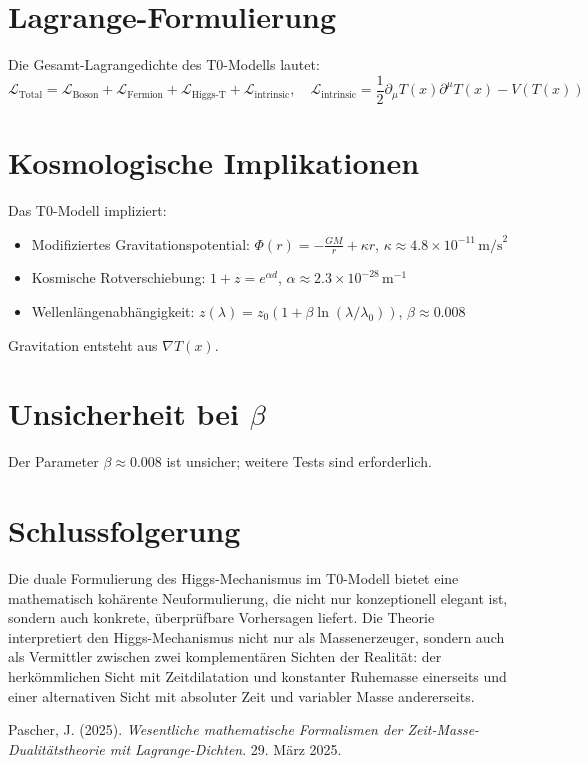 \documentclass[a4paper,12pt]{article}
\newcommand{\Tfield}{T(x)}
\begin{document}
	\section{Lagrange-Formulierung}
	Die Gesamt-Lagrangedichte des T0-Modells lautet:
	\begin{equation}
		\mathcal{L}_{\text{Total}} = \mathcal{L}_{\text{Boson}} + \mathcal{L}_{\text{Fermion}} + \mathcal{L}_{\text{Higgs-T}} + \mathcal{L}_{\text{intrinsic}}, \quad \mathcal{L}_{\text{intrinsic}} = \frac{1}{2} \partial_\mu \Tfield \partial^\mu \Tfield - V(\Tfield)
	\end{equation}
	
	\section{Kosmologische Implikationen}
	Das T0-Modell impliziert:
	\begin{itemize}
		\item Modifiziertes Gravitationspotential: \( \Phi(r) = -\frac{GM}{r} + \kappa r \), \( \kappa \approx 4.8 \times 10^{-11} \, \text{m/s}^2 \)
		\item Kosmische Rotverschiebung: \( 1 + z = e^{\alpha d} \), \( \alpha \approx 2.3 \times 10^{-28} \, \text{m}^{-1} \)
		\item Wellenlängenabhängigkeit: \( z(\lambda) = z_0 (1 + \beta \ln(\lambda/\lambda_0)) \), \( \beta \approx 0.008 \)
	\end{itemize}
	Gravitation entsteht aus \( \nabla \Tfield \).
	
	\section{Unsicherheit bei \(\beta\)}
	Der Parameter \( \beta \approx 0.008 \) ist unsicher; weitere Tests sind erforderlich.
	
	\section{Schlussfolgerung}
	Die duale Formulierung des Higgs-Mechanismus im T0-Modell bietet eine mathematisch kohärente Neuformulierung, die nicht nur konzeptionell elegant ist, sondern auch konkrete, überprüfbare Vorhersagen liefert. Die Theorie interpretiert den Higgs-Mechanismus nicht nur als Massenerzeuger, sondern auch als Vermittler zwischen zwei komplementären Sichten der Realität: der herkömmlichen Sicht mit Zeitdilatation und konstanter Ruhemasse einerseits und einer alternativen Sicht mit absoluter Zeit und variabler Masse andererseits.
	
	\begin{thebibliography}{9}
		 Pascher, J. (2025). \textit{Wesentliche mathematische Formalismen der Zeit-Masse-Dualitätstheorie mit Lagrange-Dichten}. 29. März 2025.
	\end{thebibliography}
	
\end{document}
